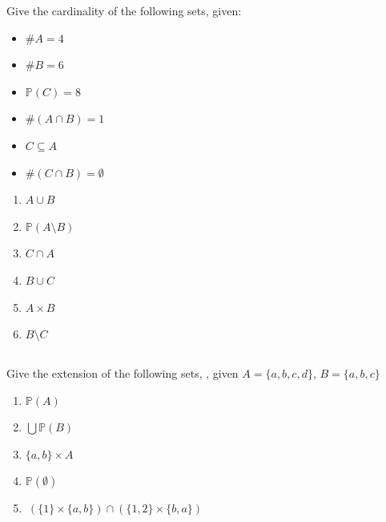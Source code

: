 \documentclass[twocolumn]{article}
\begin{document}
    Give the cardinality of the following sets, given:

\begin{multicols}{2}
    \begin{itemize}
        \item $\#A = 4$
        \item $\#B = 6$
        \item $\mathbb{P}(C) = 8$
        \item $\#(A \cap B) = 1$
        \item $ C \subseteq A $
        \item $ \# (C \cap B) = \emptyset$
    \end{itemize}
\end{multicols}
\begin{multicols}{2}
    \begin{enumerate}
        \item $ A \cup B $
        \item $ \mathbb{P}(A \setminus B)$
        \item $ C \cap A $
        \item $ B \cup C $
        \item $ A \times B $
        \item $ B \setminus C$
    \end{enumerate}
\end{multicols}

    \subsection{}

    Give the extension of the following sets, , given $A = \{a, b, c, d \}$, $B = \{a, b, c\}$

    \begin{multicols}{2}
        \begin{enumerate}
            \item $\mathbb{P}(A)$
            \item $ \bigcup  \mathbb{P}(B)  $
            \item $ \{a, b\} \times A $
            \item $ \mathbb{P} ( \emptyset ) $
        \end{enumerate}
    \end{multicols}
    \begin{enumerate}
        \setcounter{enumi}{4}
        \item $ \ ( \{ 1 \} \times \{ a, b \} ) \cap ( \{ 1, 2 \} \times \{ b, a \} ) $
    \end{enumerate}
\end{document}

